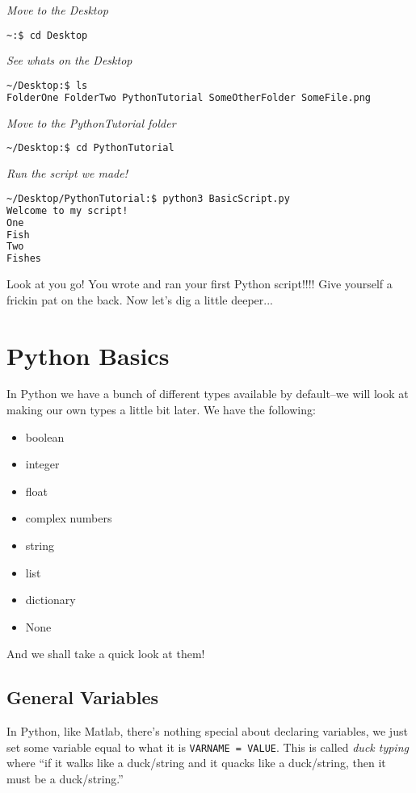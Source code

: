 \documentclass[12pt, twoside, reqno]{book}
\begin{document}
\textit{Move to the Desktop}
\begin{lstlisting}[language=sh]
~:$ cd Desktop      
\end{lstlisting}

\textit{See whats on the Desktop}
\begin{lstlisting}[language=sh]
~/Desktop:$ ls      
FolderOne FolderTwo PythonTutorial SomeOtherFolder SomeFile.png
\end{lstlisting}

\textit{Move to the PythonTutorial folder}
\begin{lstlisting}[language=sh]
~/Desktop:$ cd PythonTutorial      
\end{lstlisting}

\textit{Run the script we made!}
\begin{lstlisting}[language=sh]
~/Desktop/PythonTutorial:$ python3 BasicScript.py
Welcome to my script!
One
Fish
Two
Fishes
\end{lstlisting}

Look at you go! You wrote and ran your first Python script!!!! Give yourself a frickin pat on the back. Now let's dig a little deeper...

\section{Python Basics}

In Python we have a bunch of different types available by default--we will look at making our own types a little bit later. We have the following:

\begin{itemize}[itemsep=2px, parsep=0pt]
\item boolean
\item integer
\item float
\item complex numbers
\item string
\item list
\item dictionary
\item None
\end{itemize}

And we shall take a quick look at them!

\subsection{General Variables}

In Python, like Matlab, there's nothing special about declaring variables, we just set some variable equal to what it is \texttt{VARNAME = VALUE}. This is called \textit{duck typing} where ``if it walks like a duck/string and it quacks like a duck/string, then it must be a duck/string.''
\end{document}

